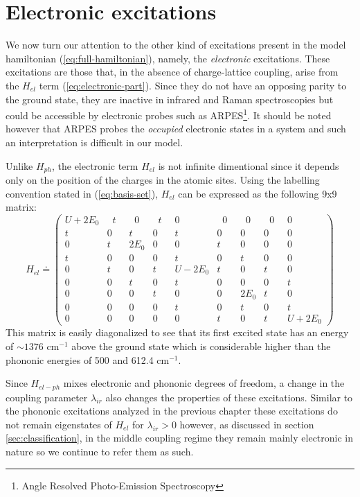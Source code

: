 \chapter{Electronic excitations}
\label{chap:electronic}

We now turn our attention to the other kind of excitations present in the model hamiltonian (\ref{eq:full-hamiltonian}), namely, the \textit{electronic} excitations.
These excitations are those that, in the absence of charge-lattice coupling, arise from the $H_{el}$ term (\ref{eq:electronic-part}).
Since they do not have an opposing parity to the ground state, they are inactive in infrared and Raman spectroscopies but could be accessible by electronic probes such as ARPES\footnote{Angle Resolved Photo-Emission Spectroscopy}.
It should be noted however that ARPES probes the \textit{occupied} electronic states in a system and such an interpretation is difficult in our model.

Unlike $H_{ph}$, the electronic term $H_{el}$ is not infinite dimentional since it depends only on the position of the charges in the atomic sites. 
Using the labelling convention stated in (\ref{eq:basis-set}), $H_{el}$ can be expressed as the following 9x9 matrix:
%
\begin{equation}\label{eq:Hel-matrix} 
  H_{el} \doteq
  \left( 
    \begin{array}{ccccccccc} 
      U+2E_0 &\;\;t\;\;&\;\;0\;\;&\;\;t\;\;&0&\;\;0\;\;&\;\;0\;\;&\;\;0\;\;&0 \\
      t&0&t&0&t&0&0&0&0 \\
      0&t&2E_0 &0&0&t&0&0&0 \\
      t&0&0&0&t&0&t&0&0 \\
      0&t&0&t&U-2E_0 &t&0&t&0 \\
      0&0&t&0&t&0&0&0&t \\
      0&0&0&t&0&0&2E_0 &t&0 \\
      0&0&0&0&t&0&t&0&t \\
      0&0&0&0&0&t&0&t&U+2E_0  
    \end{array} 
  \right)
\end{equation}
%
This matrix is easily diagonalized to see that its first excited state has an energy of $\sim 1376$ cm$^{-1}$ above the ground state which is considerable higher than the phononic energies of 500 and 612.4 cm$^{-1}$.

Since $H_{el-ph}$ mixes electronic and phononic degrees of freedom, a change in the coupling parameter $\lambda_{ir}$ also changes the properties of these excitations.
Similar to the phononic excitations analyzed in the previous chapter these excitations do not remain eigenstates of $H_{el}$ for $\lambda_{ir}>0$ however, as discussed in section \ref{sec:classification}, in the middle coupling regime they remain mainly electronic in nature so we continue to refer them as such.

